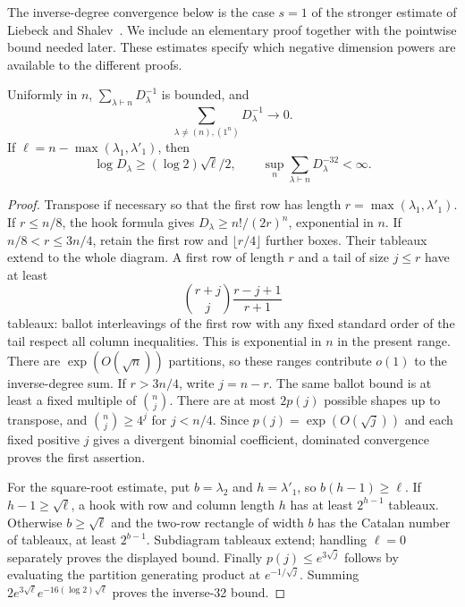 The inverse-degree convergence below is the case $s=1$ of the stronger estimate of Liebeck and Shalev~\cite[Theorem~2.6]{liebeck-shalev2004}. We include an elementary proof together with the pointwise bound needed later. These estimates specify which negative dimension powers are available to the different proofs.
\begin{lemma}\label{lem:degrees}
Uniformly in $n$, $\sum_{\lambda\vdash n}D_\lambda^{-1}$ is bounded, and
\[
 \sum_{\lambda\ne(n),(1^n)}D_\lambda^{-1}\longrightarrow0.
\]
If $\ell=n-\max(\lambda_1,\lambda'_1)$, then
\[
 \log D_\lambda\ge(\log2)\sqrt\ell/2,
 \qquad \sup_n\sum_{\lambda\vdash n}D_\lambda^{-32}<\infty.
\]
\end{lemma}
\begin{proof}
Transpose if necessary so that the first row has length $r=\max(\lambda_1,\lambda'_1)$. If $r\le n/8$, the hook formula gives $D_\lambda\ge n!/(2r)^n$, exponential in $n$. If $n/8<r\le3n/4$, retain the first row and $\lfloor r/4\rfloor$ further boxes. Their tableaux extend to the whole diagram. A first row of length $r$ and a tail of size $j\le r$ have at least
\[
 \binom{r+j}{j}\frac{r-j+1}{r+1}
\]
tableaux: ballot interleavings of the first row with any fixed standard order of the tail respect all column inequalities. This is exponential in $n$ in the present range. There are $\exp(O(\sqrt n))$ partitions, so these ranges contribute $o(1)$ to the inverse-degree sum. If $r>3n/4$, write $j=n-r$. The same ballot bound is at least a fixed multiple of $\binom nj$. There are at most $2p(j)$ possible shapes up to transpose, and $\binom nj\ge4^j$ for $j<n/4$. Since $p(j)=\exp(O(\sqrt j))$ and each fixed positive $j$ gives a divergent binomial coefficient, dominated convergence proves the first assertion.

For the square-root estimate, put $b=\lambda_2$ and $h=\lambda'_1$, so $b(h-1)\ge\ell$. If $h-1\ge\sqrt\ell$, a hook with row and column length $h$ has at least $2^{h-1}$ tableaux. Otherwise $b\ge\sqrt\ell$ and the two-row rectangle of width $b$ has the Catalan number of tableaux, at least $2^{b-1}$. Subdiagram tableaux extend; handling $\ell=0$ separately proves the displayed bound. Finally $p(j)\le e^{3\sqrt j}$ follows by evaluating the partition generating product at $e^{-1/\sqrt j}$. Summing $2e^{3\sqrt\ell}e^{-16(\log2)\sqrt\ell}$ proves the inverse-32 bound.
\end{proof}
